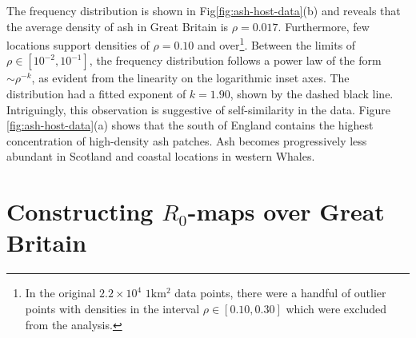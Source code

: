 The frequency distribution is shown in Fig\ref{fig:ash-host-data}(b) and reveals that the average density of ash in Great Britain is $\rho=0.017$. Furthermore, few locations support densities of $\rho=0.10$ and over\footnote{In the original $2.2\times 10^4$ $1\mathrm{km^2}$ data points, there were a handful of outlier points with densities in the interval $\rho \in [0.10, 0.30]$ which were excluded from the analysis.}.  Between the limits of $\rho \in [10^{-2}, 10^{-1}]$, the frequency distribution follows a power law of the form $\sim \rho ^{-k}$, as evident from the linearity on the logarithmic inset axes. The distribution had a fitted exponent of $k=1.90$, shown by the dashed black line. Intriguingly, this observation is suggestive of self-similarity in the data. Figure \ref{fig:ash-host-data}(a) shows that the south of England contains the highest concentration of high-density ash patches. Ash becomes progressively less abundant in Scotland and coastal locations in western Whales.

% 

\section{Constructing $R_0$-maps over Great Britain}




